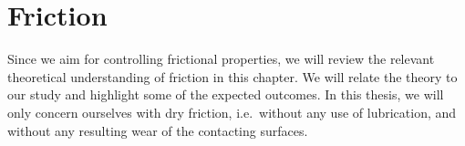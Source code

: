 





\chapter{Friction}\label{chap:friction} %
Since we aim for controlling frictional properties, we will review the relevant
theoretical understanding of friction in this chapter. We will relate the
theory to our study and highlight some of the expected outcomes. In this thesis,
we will only concern ourselves with dry friction, i.e.\ without any use of lubrication, and without any resulting wear of the contacting
surfaces. 




